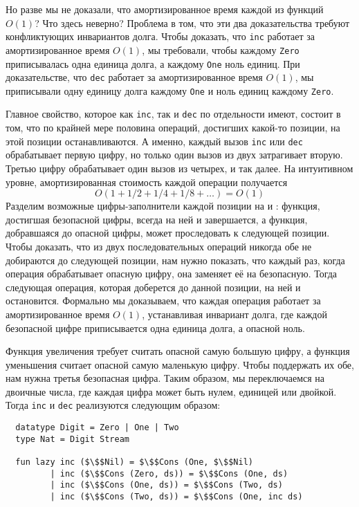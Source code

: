 \begin{frame}[fragile]{}
Но разве мы не доказали, что амортизированное время каждой из функций
$O(1)$? Что здесь неверно? Проблема в том, что эти два доказательства
требуют конфликтующих инвариантов долга. Чтобы доказать, что
\lstinline!inc! работает за амортизированное время $O(1)$, мы
требовали, чтобы каждому \lstinline!Zero! приписывалась одна единица
долга, а каждому \lstinline!One! ноль единиц. При доказательстве, что
\lstinline!dec! работает за амортизированное время $O(1)$, мы
приписывали одну единицу долга каждому \lstinline!One! и ноль единиц
каждому \lstinline!Zero!.

Главное свойство, которое как \lstinline!inc!, так и \lstinline!dec!
по отдельности имеют, состоит в том, что по крайней мере половина
операций, достигших какой-то позиции, на этой позиции
останавливаются. А именно, каждый вызов \lstinline!inc! или
\lstinline!dec! обрабатывает первую цифру, но только один вызов из
двух затрагивает вторую. Третью цифру обрабатывает один вызов из
четырех, и так далее. На интуитивном уровне, амортизированная
стоимость каждой операции получается
$$
O(1 + 1/2 + 1/4 + 1/8 + \ldots) = O(1)
$$
Разделим возможные цифры-заполнители каждой позиции на
 и : функция,
достигшая безопасной цифры, всегда на ней и завершается, а функция,
добравшаяся до опасной цифры, может проследовать к следующей
позиции. Чтобы доказать, что из двух последовательных операций никогда
обе не добираются до следующей позиции, нам нужно показать, что каждый
раз, когда операция обрабатывает опасную цифру, она заменяет её на
безопасную. Тогда следующая операция, которая доберется до данной
позиции, на ней и остановится. Формально мы доказываем, что каждая
операция работает за амортизированное время $O(1)$, устанавливая
инвариант долга, где каждой безопасной цифре приписывается одна
единица долга, а опасной ноль.

Функция увеличения требует считать опасной самую большую цифру, а
функция уменьшения считает опасной самую маленькую цифру. Чтобы
поддержать их обе, нам нужна третья безопасная цифра. Таким образом,
мы переключаемся на  двоичные числа, где
каждая цифра может быть нулем, единицей или двойкой. Тогда
\lstinline!inc! и \lstinline!dec! реализуются следующим образом:
\begin{lstlisting}
  datatype Digit = Zero | One | Two
  type Nat = Digit Stream

  fun lazy inc ($\$$Nil) = $\$$Cons (One, $\$$Nil)
         | inc ($\$$Cons (Zero, ds)) = $\$$Cons (One, ds)
         | inc ($\$$Cons (One, ds)) = $\$$Cons (Two, ds)
         | inc ($\$$Cons (Two, ds)) = $\$$Cons (One, inc ds)


\end{lstlisting}
\end{frame}
